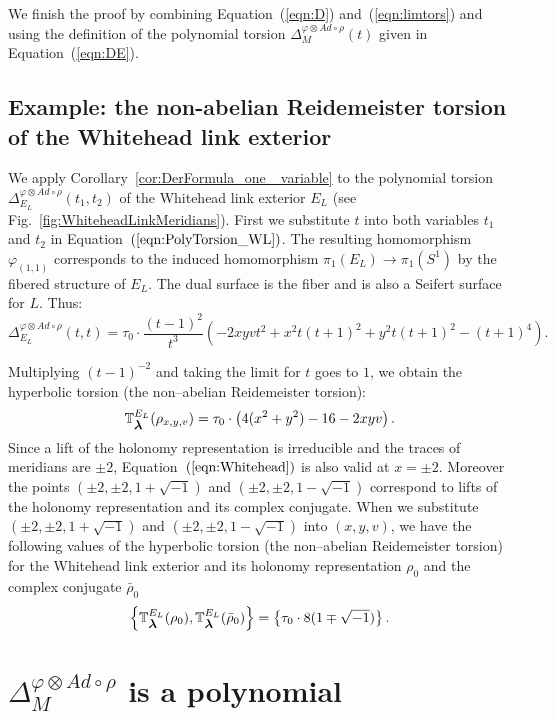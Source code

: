 \documentclass[a4paper]{amsart}
\theoremstyle{plain}
\theoremstyle{definition}
\theoremstyle{remark}
\newcommand{\smallbm}[1]{\mbox{\small \boldmath $#1$}}
\newcommand{\PolyTors}[2]{\Delta_{#1}^{#2}}
\newcommand{\RTors}[2]{\mathbb{T}^{#1}_{#2}}
\newcommand{\otAd}[2]{#1 \otimes Ad \circ #2}
\begin{document}
We finish the proof by combining Equation~(\ref{eqn:D})
and~(\ref{eqn:limtors}) and using the definition of the polynomial
torsion $\PolyTors{M}{\otAd{\varphi}{\rho}}(t)$ given in
Equation~(\ref{eqn:DE}).

\subsection{Example: the non-abelian Reidemeister torsion of the Whitehead
  link exterior}\label{ex:Whitehead}

We apply Corollary~\ref{cor:DerFormula_one _variable} to the
polynomial torsion $\PolyTors{E_L}{\otAd{\varphi}{\rho}}(t_1, t_2)$ of
the Whitehead link exterior $E_L$ (see Fig.~\ref{fig:WhiteheadLinkMeridians}).  First we substitute $t$ into both
variables $t_1$ and $t_2$ in Equation~$(\ref{eqn:PolyTorsion_WL})$.  The
resulting homomorphism $\varphi_{(1,1)}$ corresponds to the induced
homomorphism $\pi_1(E_L) \to \pi_1(S^1)$ by the fibered structure of
$E_L$.  The dual surface is the fiber and is also a Seifert surface
for $L$.  Thus:
\[
\PolyTors{E_L}{\otAd{\varphi}{\rho}}(t,t) = \tau_0 \cdot
\frac{(t-1)^2}{t^3} \left( -2xyv t^2 + x^2 t(t+1)^2 + y^2 t (t+1)^2 -
  (t+1)^4 \right).
\]

Multiplying $(t-1)^{-2}$ and taking the limit for $t$ goes to $1$, we
obtain the hyperbolic torsion (the non--abelian Reidemeister torsion):
\begin{equation}\label{eqn:Whitehead}
  \RTors{E_L}{\smallbm{\lambda}}(\rho_{x, y, v}) 
  = \tau_0 \cdot 
  \left( 4(x^2+y^2)-16-2xyv \right).
\end{equation}
Since a lift of the holonomy representation is irreducible and the
traces of meridians are $\pm 2$, Equation~$(\ref{eqn:Whitehead})$ is also
valid at $x = \pm 2$.  Moreover the points $(\pm 2, \pm 2, 1 +
\sqrt{-1})$ and $(\pm 2, \pm 2, 1 - \sqrt{-1})$ correspond to lifts of
the holonomy representation and its complex conjugate.  When we
substitute $(\pm 2, \pm 2, 1 + \sqrt{-1})$ and $(\pm 2, \pm 2, 1 -
\sqrt{-1})$ into $(x, y, v)$, we have the following values of the
hyperbolic torsion (the non--abelian Reidemeister torsion) for the Whitehead link exterior and
its holonomy representation $\rho_0$ and the complex conjugate $\bar
\rho_0$
\[
\left\{\RTors{E_L}{\smallbm{\lambda}}(\rho_0),
\RTors{E_L}{\smallbm{\lambda}}(\bar \rho_0) \right\} = \left\{\tau_0 \cdot 8(1 \mp
\sqrt{-1})\right\}.
\]

\section{$\PolyTors{M}{\otAd{\varphi}{\rho}}$ is a polynomial}
\label{section:poly}
\end{document}
